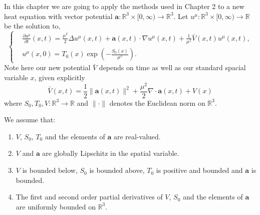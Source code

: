 \documentclass[a4paper,12pt,draft]{report}
\begin{document}
In this chapter we are going to apply the methods used in Chapter 2 to a new heat equation with vector potential $\mathbf{a} : \mathbb{R}^3 \times [0, \infty) \to \mathbb{R}^3$.  Let $u^\mu : \mathbb{R}^3 \times [0, \infty) \to \mathbb{R}$ be the solution to,
\begin{equation}
\left\{
\begin{aligned}
& \frac{\partial u^\mu}{\partial t}(x, t) = \frac{\mu^2}{2}\Delta u^\mu(x, t) + \mathbf{a}(x, t)\cdot\nabla u^\mu(x, t) + \frac{1}{\mu^2}\bar{V}(x, t)u^\mu(x, t),\\ \label{VPHE}
& u^\mu(x, 0) = T_0(x)\exp\left(-\frac{S_0(x)}{\mu^2}\right).
\end{aligned}
\right.
\end{equation}
Note here our new potential $\bar{V}$ depends on time as well as our standard spacial variable $x$, given explicitly
$$
\bar{V}(x, t) = \frac{1}{2}\|\mathbf{a}(x, t)\|^2 + \frac{\mu^2}{2}\nabla\cdot\mathbf{a}(x, t) + V(x)
$$
where $S_{0}, T_{0}, V:\mathbb{R}^3  \to \mathbb{R}$ and $\|\cdot\|$ denotes the Euclidean norm on $\mathbb{R}^3$.
\assumption
{
We assume that:
\begin{enumerate}
\item $V$, $S_0$, $T_0$ and the elements of $\mathbf{a}$ are real-valued.
\item $V$ and $\mathbf{a}$ are globally Lipschitz in the spatial variable.
\item $V$ is bounded below, $S_0$ is bounded above, $T_0$ is positive and bounded and $\mathbf{a}$ is bounded.
\item The first and second order partial derivatives of $V$, $S_0$ and the elements of $\mathbf{a}$ are uniformly bounded on $\mathbb{R}^3$.
\end{enumerate}
}
\end{document}
